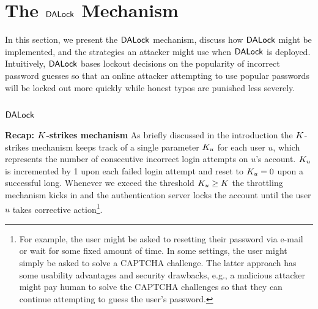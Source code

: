 
\vspace*{-\baselineskip}
\section{The $\mathsf{DALock}$ Mechanism}\label{sec:DALockAlgorithm} %

In this section, we present the $\mathsf{DALock}$ mechanism, discuss how $\mathsf{DALock}$ might be implemented, and the strategies an attacker might use when $\mathsf{DALock}$ is deployed. Intuitively, $\mathsf{DALock}$ bases lockout decisions on the popularity of incorrect password guesses so that an online attacker attempting to use popular passwords will be locked out more quickly while honest typos are punished less severely. 
\vspace*{-\baselineskip}
\subsection{$\mathsf{DALock}$} %
\vspace*{-\baselineskip}
{\bf \noindent Recap: $K$-strikes mechanism} As briefly discussed in the introduction the $K$-strikes mechanism keeps track of a single parameter $K_u$ for each user $u$, which represents the number of consecutive incorrect login attempts on $u$’s account. $K_u$ is incremented by 1 upon each failed login attempt and reset to $K_u=0$ upon a successful long. Whenever we exceed the threshold  $K_u \geq K$  the throttling mechanism kicks in and the authentication server locks the account until the user $u$ takes corrective action\footnote{For example, the user might be asked to resetting their password via e-mail or wait for some fixed amount of time. In some settings, the user might simply be asked to solve a CAPTCHA challenge. The latter approach has some usability advantages and security drawbacks, e.g., a malicious attacker might pay human to solve the CAPTCHA challenges so that they can continue attempting to guess the user's password.}.


